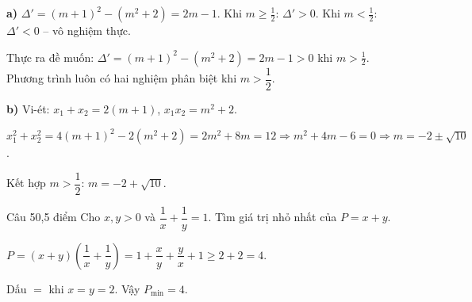 \begin{loi_giai_cau}
\textbf{a)} $\Delta'=(m+1)^2-(m^2+2)=2m-1$. Khi $m\ge\frac{1}{2}$: $\Delta'>0$. Khi $m<\frac{1}{2}$: $\Delta'<0$ -- vô nghiệm thực.

Thực ra đề muốn: $\Delta'=(m+1)^2-(m^2+2)=2m-1>0$ khi $m>\frac{1}{2}$. Phương trình luôn có hai nghiệm phân biệt khi $m>\dfrac{1}{2}$.

\textbf{b)} Vi-ét: $x_1+x_2=2(m+1)$, $x_1x_2=m^2+2$.

$x_1^2+x_2^2=4(m+1)^2-2(m^2+2)=2m^2+8m=12\Rightarrow m^2+4m-6=0\Rightarrow m=-2\pm\sqrt{10}$.

Kết hợp $m>\dfrac{1}{2}$: $m=\boxed{-2+\sqrt{10}}$.
\end{loi_giai_cau}

\begin{de_cau}{Câu 5}{0,5 điểm}
Cho $x, y > 0$ và $\dfrac{1}{x}+\dfrac{1}{y}=1$. Tìm giá trị nhỏ nhất của $P=x+y$.
\end{de_cau}

\begin{loi_giai_cau}
$P=(x+y)\left(\dfrac{1}{x}+\dfrac{1}{y}\right)=1+\dfrac{x}{y}+\dfrac{y}{x}+1\ge2+2=4$.

Dấu $=$ khi $x=y=2$. Vậy $P_{\min}=\boxed{4}$.
\end{loi_giai_cau}
